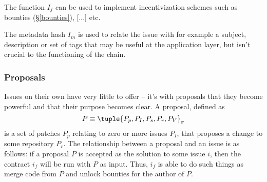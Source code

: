 The function $I_f$ can be used to implement incentivization schemes such as
bounties (\S \ref{bounties}), [...] etc.

The metadata hash $I_m$ is used to relate the issue with for example a subject,
description or set of tags that may be useful at the application layer, but
isn't crucial to the functioning of the chain.

\subsubsection{Proposals}

Issues on their own have very little to offer -- it's with proposals that they
become powerful and that their purpose becomes clear. A proposal, defined as
\[
    P \equiv \tuple{P_p, P_I, P_s, P_r, P_V}_{\sigma}
\]
is a set of patches $P_p$ relating to zero or more issues $P_I$, that proposes
a change to some repository $P_r$. The relationship between a proposal and
an issue is as follows: if a proposal $P$ is accepted as the solution to
some issue $i$, then the contract $i_f$ will be run with $P$ as input. Thus,
$i_f$ is able to do such things as merge code from $P$ and unlock bounties
for the author of $P$.



